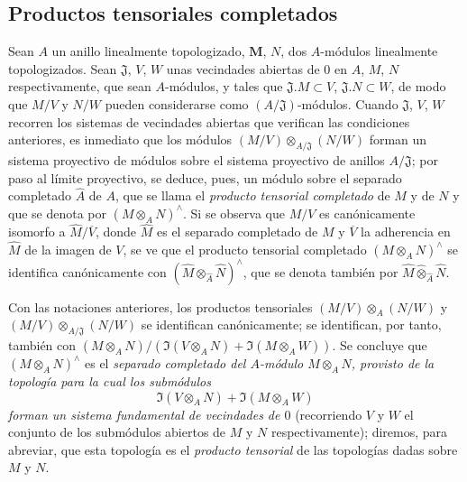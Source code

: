 \subsection{Productos tensoriales completados}
\label{subsection:0.7.7-fr}

\begin{env}[7.7.1]
\label{0.7.7.1-fr}
Sean $A$ un anillo linealmente topologizado, $\mathbf{M}$, $N$, dos $A$-módulos
linealmente topologizados. Sean $\mathfrak J$, $V$, $W$ unas vecindades
abiertas de $0$ en $A$, $M$, $N$ respectivamente, que sean
$A$-módulos, y tales que $\mathfrak J.M\subset V$, $\mathfrak J.N\subset W$,
de modo que $M/V$ y $N/W$ pueden considerarse como
$(A/\mathfrak J)$-módulos. Cuando $\mathfrak J$, $V$, $W$ recorren los
sistemas de vecindades abiertas que verifican las condiciones anteriores, es
inmediato que los módulos
$(M/V)\otimes_{A/\mathfrak J}(N/W)$ forman un sistema proyectivo de módulos
sobre el sistema proyectivo de anillos $A/\mathfrak J$; por paso al límite
proyectivo, se deduce, pues, un módulo sobre el separado completado $\widehat A$
de $A$, que se llama el \emph{producto tensorial completado} de $M$ y de
$N$ y que se denota por $(M\otimes_A N)^\wedge$. Si se observa que $M/V$
es canónicamente isomorfo a $\widehat M/\overline V$, donde $\widehat M$ es
el separado completado de $M$ y $\overline V$ la adherencia en $\widehat M$ de
la imagen de $V$, se ve que el producto tensorial completado
$(M\otimes_A N)^\wedge$ se identifica canónicamente con
$(\widehat M\otimes_{\widehat A}\widehat N)^\wedge$, que se denota también por
$\widehat M\widehat\otimes_{\widehat A}\widehat N$.
\end{env}

\begin{env}[7.7.2]
\label{0.7.7.2-fr}
\begin{sloppypar}
Con las notaciones anteriores, los productos tensoriales
$(M/V)\otimes_A(N/W)$ y
$(M/V)\otimes_{A/\mathfrak J}(N/W)$ se identifican canónicamente;
se identifican, por tanto, también con
$(M\otimes_A N)/(\Im(V\otimes_A N)+\Im(M\otimes_A W))$.
Se concluye que $(M\otimes_A N)^\wedge$ es el \emph{separado completado del
$A$-módulo $M\otimes_A N$, provisto de la topología para la cual los
submódulos}
\[
  \Im(V\otimes_A N)+\Im(M\otimes_A W)
\]
\emph{forman un sistema fundamental de vecindades de $0$} (recorriendo $V$ y $W$
el conjunto de los submódulos abiertos de $M$ y $N$
respectivamente); diremos, para abreviar, que esta topología es el
\emph{producto tensorial} de las topologías dadas sobre $M$ y $N$.
\end{sloppypar}
\end{env}

